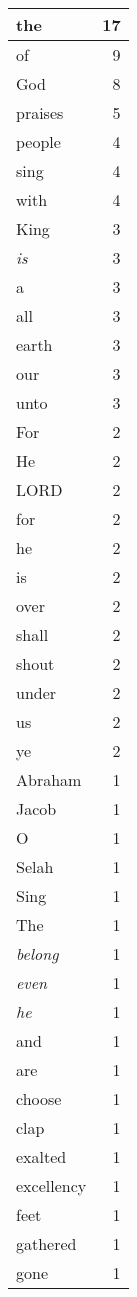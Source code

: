 \begin{center}
\begin{longtable}{l|r}
\hline \hline
\endlastfoot
the & 17 \\ \hline
of & 9 \\ \hline
God & 8 \\ \hline
praises & 5 \\ \hline
people & 4 \\ \hline
sing & 4 \\ \hline
with & 4 \\ \hline
King & 3 \\ \hline
\emph{is} & 3 \\ \hline
a & 3 \\ \hline
all & 3 \\ \hline
earth & 3 \\ \hline
our & 3 \\ \hline
unto & 3 \\ \hline
For & 2 \\ \hline
He & 2 \\ \hline
LORD & 2 \\ \hline
for & 2 \\ \hline
he & 2 \\ \hline
is & 2 \\ \hline
over & 2 \\ \hline
shall & 2 \\ \hline
shout & 2 \\ \hline
under & 2 \\ \hline
us & 2 \\ \hline
ye & 2 \\ \hline
Abraham & 1 \\ \hline
Jacob & 1 \\ \hline
O & 1 \\ \hline
Selah & 1 \\ \hline
Sing & 1 \\ \hline
The & 1 \\ \hline
\emph{belong} & 1 \\ \hline
\emph{even} & 1 \\ \hline
\emph{he} & 1 \\ \hline
and & 1 \\ \hline
are & 1 \\ \hline
choose & 1 \\ \hline
clap & 1 \\ \hline
exalted & 1 \\ \hline
excellency & 1 \\ \hline
feet & 1 \\ \hline
gathered & 1 \\ \hline
gone & 1 \\ \hline

\end{longtable}
\end{center}

